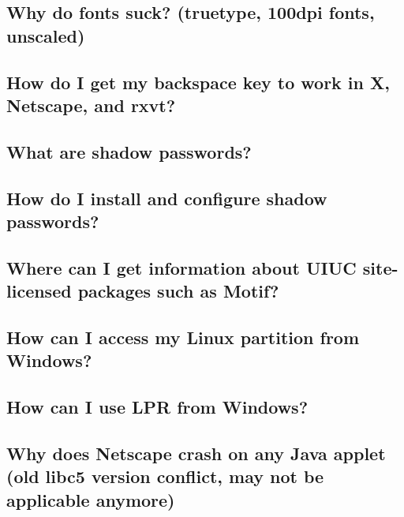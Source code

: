 \documentclass[a4paper]{article}
\begin{document}
\subsection{Why do fonts suck? (truetype, 100dpi fonts, unscaled)}






\subsection{How do I get my backspace key to work in X, Netscape, and rxvt?}






\subsection{What are shadow passwords?}






\subsection{How do I install and configure shadow passwords?}






\subsection{Where can I get information about UIUC site-licensed packages such as Motif?}






\subsection{How can I access my Linux partition from Windows?}






\subsection{How can I use LPR from Windows?}






\subsection{Why does Netscape crash on any Java applet (old libc5 version conflict, may not be applicable anymore)}
\end{document}
